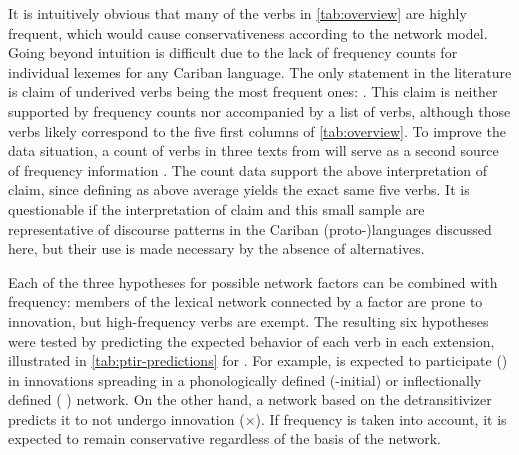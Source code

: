 It is intuitively obvious that many of the verbs in \cref{tab:overview} are highly frequent, which would cause conservativeness according to the network model.
Going beyond intuition is difficult due to the lack of frequency counts for individual lexemes for any Cariban language.
The only statement in the literature is  claim of \kalina underived  verbs being the most frequent ones: .
This claim is neither supported by frequency counts nor accompanied by a list of verbs, although those verbs likely correspond to the five first columns of \cref{tab:overview}.
To improve the data situation, a count of  verbs in three \apalai texts from \textcite{koehns1994textos} will serve as a second source of frequency information .
The count data support the above interpretation of  claim, since defining  as above average yields the exact same five verbs.
It is questionable if the interpretation of  claim and this small \apalai sample are representative of discourse patterns in the Cariban (proto-)languages discussed here, but their use is made necessary by the absence of alternatives.




Each of the three hypotheses for possible network factors can be combined with frequency: members of the lexical network connected by a factor are prone to innovation, but high-frequency verbs are exempt.
The resulting six hypotheses were tested by predicting the expected behavior of each verb in each extension, illustrated in \cref{tab:ptir-predictions} for \PTir.
For example,   is expected to participate (\checkmark) in innovations spreading in a phonologically defined (-initial) or inflectionally defined ( ) network.
On the other hand, a network based on the detransitivizer predicts it to not undergo innovation (×).
If frequency is taken into account, it is expected to remain conservative regardless of the basis of the network.



